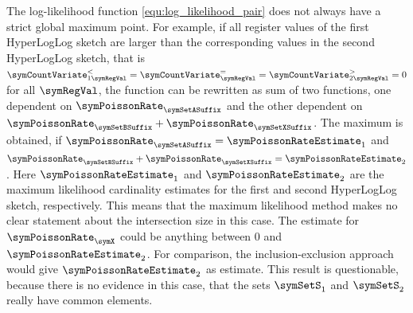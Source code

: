 \documentclass[a4paper]{scrartcl}
\begin{document}
The log-likelihood function \eqref{equ:log_likelihood_pair} does not always have a strict global maximum point. For example, if all register values of the first HyperLogLog sketch are larger than the corresponding values in the second HyperLogLog sketch, that is $\symCountVariate_{1\symRegVal}^{<}
=
\symCountVariate_{\symRegVal}^{=}
=
\symCountVariate_{2\symRegVal}^{>}
=
0$ for all $\symRegVal$, the function can be rewritten as sum of two functions, one dependent on $\symPoissonRate_\symSetASuffix$ and the other dependent on $\symPoissonRate_\symSetBSuffix+\symPoissonRate_\symSetXSuffix$. 
The maximum is obtained, if $\symPoissonRate_\symSetASuffix = \symPoissonRateEstimate_1$ and $\symPoissonRate_\symSetBSuffix+\symPoissonRate_\symSetXSuffix = \symPoissonRateEstimate_2$. Here $\symPoissonRateEstimate_1$ and $\symPoissonRateEstimate_2$ are the maximum likelihood cardinality estimates for the first and second HyperLogLog sketch, respectively. This means that the maximum likelihood method makes no clear statement about the intersection size in this case. The estimate for $\symPoissonRate_\symX$ could be anything between 0 and $\symPoissonRateEstimate_2$. For comparison, the inclusion-exclusion approach would give $\symPoissonRateEstimate_2$ as estimate. This result is questionable, because there is no evidence in this case, that the sets $\symSetS_1$ and $\symSetS_2$ really have common elements.

\end{document}

